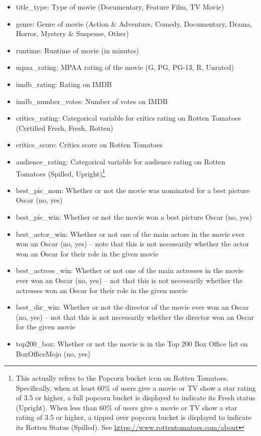 \documentclass{article}
\begin{document}
\vspace{-0.5cm}
\begin{itemize}
\setlength\itemsep{-0.5em}
\item title\_type: Type of movie (Documentary, Feature Film, TV Movie)
\item genre: Genre of movie (Action \& Adventure, Comedy, Documentary, Drama, Horror, Mystery \& Suspense, Other)
\item runtime: Runtime of movie (in minutes)
\item mpaa\_rating: MPAA rating of the movie (G, PG, PG-13, R, Unrated)
\item imdb\_rating: Rating on IMDB
\item imdb\_number\_votes: Number of votes on IMDB
\item critics\_rating: Categorical variable for critics rating on Rotten Tomatoes (Certified Fresh, Fresh, Rotten)
\item critics\_score: Critics score on Rotten Tomatoes
\item audience\_rating: Categorical variable for audience rating on Rotten Tomatoes (Spilled, Upright)\footnote{This actually refers to the Popcorn bucket icon on Rotten Tomatoes. Specifically, when at least 60\% of users give a movie or TV show a star rating of 3.5 or higher, a full popcorn bucket is displayed to indicate its Fresh status (Upright). When less than 60\% of users give a movie or TV show a star rating of 3.5 or higher, a tipped over popcorn bucket is displayed to indicate its Rotten Status (Spilled). See \url{https://www.rottentomatoes.com/about}}
\item best\_pic\_nom: Whether or not the movie was nominated for a best picture Oscar (no, yes)
\item best\_pic\_win: Whether or not the movie won a best picture Oscar (no, yes)
\item best\_actor\_win: Whether or not one of the main actors in the movie ever won an Oscar (no, yes) – note that this is not necessarily whether the actor won an Oscar for their role in the given movie
\item best\_actress\_win: Whether or not one of the main actresses in the movie ever won an Oscar (no, yes) – not that this is not necessarily whether the actresses won an Oscar for their role in the given movie
\item best\_dir\_win: Whether or not the director of the movie ever won an Oscar (no, yes) – not that this is not necessarily whether the director won an Oscar for the given movie
\item top200\_box: Whether or not the movie is in the Top 200 Box Office list on BoxOfficeMojo (no, yes)
\end{itemize}
\end{document}
